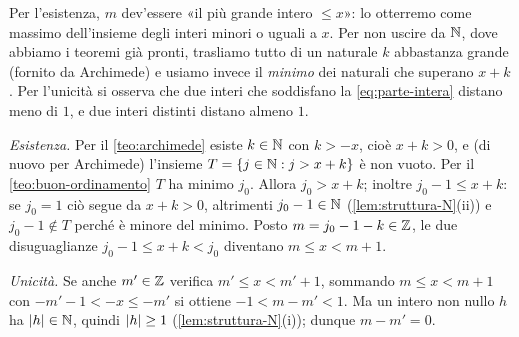 \begin{schema}
\end{schema}

\begin{strategia}
Per l'esistenza, $m$ dev'essere «il più grande intero $\le x$»: lo otterremo come
massimo dell'insieme degli interi minori o uguali a $x$. Per non uscire da $\mathbb{N}$, dove
abbiamo i teoremi già pronti, trasliamo tutto di un naturale $k$ abbastanza grande
(fornito da Archimede) e usiamo invece il \emph{minimo} dei naturali che superano $x+k$.
Per l'unicità si osserva che due interi che soddisfano la \eqref{eq:parte-intera}
distano meno di $1$, e due interi distinti distano almeno $1$.
\end{strategia}

\begin{dimostrazione}
\emph{Esistenza.} Per il \cref{teo:archimede} esiste $k\in\mathbb{N}$ con $k>-x$, cioè $x+k>0$,
e (di nuovo per Archimede) l'insieme $T=\{j\in\mathbb{N} : j>x+k\}$ è non vuoto. Per il
\cref{teo:buon-ordinamento} $T$ ha minimo $j_{0}$. Allora $j_{0}>x+k$; inoltre
$j_{0}-1\le x+k$: se $j_{0}=1$ ciò segue da $x+k>0$, altrimenti $j_{0}-1\in\mathbb{N}$
(\cref{lem:struttura-N}(ii)) e $j_{0}-1\notin T$ perché è minore del minimo. Posto
$m=j_{0}-1-k\in\mathbb{Z}$, le due disuguaglianze $j_{0}-1\le x+k<j_{0}$ diventano $m\le x<m+1$.

\emph{Unicità.} Se anche $m'\in\mathbb{Z}$ verifica $m'\le x<m'+1$, sommando $m\le x<m+1$ con
$-m'-1<-x\le-m'$ si ottiene $-1<m-m'<1$. Ma un intero non nullo $h$ ha $\lvert h\rvert\in\mathbb{N}$,
quindi $\lvert h\rvert\ge1$ (\cref{lem:struttura-N}(i)); dunque $m-m'=0$.
\end{dimostrazione}

\begin{marginfigure}
\centering
{}
\caption{Il grafico della funzione parte intera $y=\lfloor x\rfloor$: una «scala» con
gradini chiusi a sinistra e aperti a destra.}
\label{fig:parte-intera}
\end{marginfigure}

